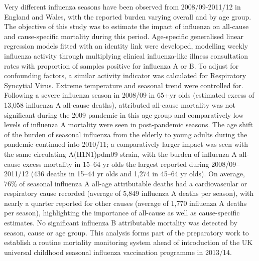 \cite{greenMortalityAttributableInfluenza2013}
Very different influenza seasons have been observed from 2008/09-2011/12 in
England and Wales, with the reported burden varying overall and by age group.
The objective of this study was to estimate the impact of influenza on
all-cause and cause-specific mortality during this period. Age-specific
generalised linear regression models fitted with an identity link were
developed, modelling weekly influenza activity through multiplying clinical
influenza-like illness consultation rates with proportion of samples positive
for influenza A or B. To adjust for confounding factors, a similar activity
indicator was calculated for Respiratory Syncytial Virus. Extreme temperature
and seasonal trend were controlled for. Following a severe influenza season in
2008/09 in 65+yr olds (estimated excess of 13,058 influenza A all-cause
deaths), attributed all-cause mortality was not significant during the 2009
pandemic in this age group and comparatively low levels of influenza A
mortality were seen in post-pandemic seasons. The age shift of the burden of
seasonal influenza from the elderly to young adults during the pandemic
continued into 2010/11; a comparatively larger impact was seen with the same
circulating A(H1N1)pdm09 strain, with the burden of influenza A all-cause
excess mortality in 15–64 yr olds the largest reported during 2008/09–2011/12
(436 deaths in 15–44 yr olds and 1,274 in 45–64 yr olds). On average, 76\% of
seasonal influenza A all-age attributable deaths had a cardiovascular or
respiratory cause recorded (average of 5,849 influenza A deaths per season),
with nearly a quarter reported for other causes (average of 1,770 influenza A
deaths per season), highlighting the importance of all-cause as well as
cause-specific estimates. No significant influenza B attributable mortality was
detected by season, cause or age group. This analysis forms part of the
preparatory work to establish a routine mortality monitoring system ahead of
introduction of the UK universal childhood seasonal influenza vaccination
programme in 2013/14.

